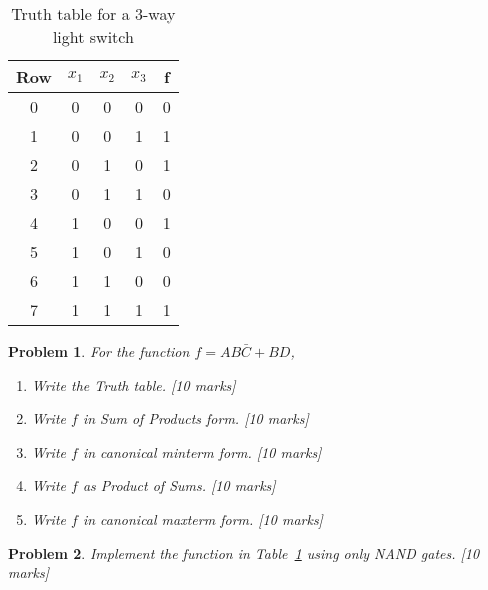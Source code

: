 \documentclass{article}
\newtheorem{prob}{Problem}
\newcommand{\bC}{\bar{C}}
\begin{document}
\begin{table}
  \centering
  \begin{tabular}{c|ccc||c}
    \toprule
    Row & $x_1$ & $x_2$ & $x_3$ & f \\
    \midrule
    0 & 0 & 0 & 0 & 0 \\
    1 & 0 & 0 & 1 & 1 \\
    2 & 0 & 1 & 0 & 1 \\
    3 & 0 & 1 & 1 & 0 \\
    4 & 1 & 0 & 0 & 1 \\
    5 & 1 & 0 & 1 & 0 \\
    6 & 1 & 1 & 0 & 0 \\
    7 & 1 & 1 & 1 & 1 \\
    \bottomrule
    \end{tabular}
    \caption{Truth table for a 3-way light switch}
    \label{tab:3-way-light-switch}
\end{table}

\begin{prob}
  For the function $f = AB\bC + BD$,
  \begin{enumerate}
    \item Write the Truth table. [10 marks]
    \item Write $f$ in Sum of Products form. [10 marks]
    \item Write $f$ in canonical minterm form. [10 marks]
    \item Write $f$ as Product of Sums. [10 marks]
    \item Write $f$ in canonical maxterm form. [10 marks]
  \end{enumerate}
\end{prob}

\begin{prob}
 Implement the function in Table~\ref{tab:3-way-light-switch} using only NAND
 gates. [10 marks]
\end{prob}
\end{document}
